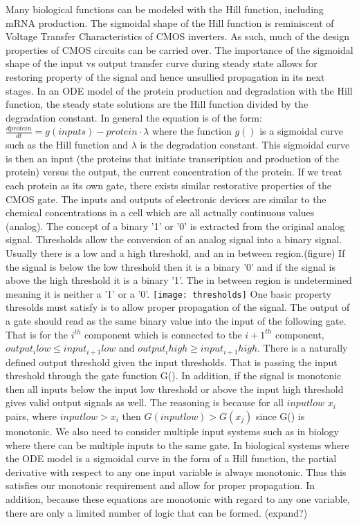 \documentclass{article}
\begin{document}
Many biological functions can be modeled with the Hill function, including mRNA production.  The sigmoidal shape of the Hill function is reminiscent of Voltage Transfer Characteristics of CMOS inverters.  As such, much of the design properties of CMOS circuits can be carried over.  The importance of the sigmoidal shape of the input vs output transfer curve during steady state allows for restoring property of the signal and hence unsullied propagation in its next stages.   In an ODE model of the protein production and degradation with the Hill function, the steady state solutions are the Hill function divided by the degradation constant.  In general the equation is of the form: $\frac{dprotein}{dt}=g(inputs)-protein\cdot\lambda$  where the function $g()$ is a sigmoidal curve such as the Hill function and $\lambda$ is the degradation constant.  This sigmoidal curve is then an input (the proteins that initiate transcription and production of the protein) versus the output, the current concentration of the protein.  If we treat each protein as its own gate, there exists similar restorative properties of the CMOS gate.
\newline \newline
The inputs and outputs of electronic devices are similar to the chemical concentrations in a cell which are all actually continuous values (analog).  The concept of a binary '1' or '0' is extracted from the original analog signal.  Thresholds allow the conversion of an analog signal into a binary signal.  Usually there is a low and a high threshold, and an in between region.(figure)  If the signal is below the low threshold then it is a binary '0' and if the signal is above the high threshold it is a binary '1'.  The in between region is undetermined meaning it is neither a '1' or a '0'.   
\newline
\texttt{[image: thresholds]}
\newline
One basic property thresolds must satisfy is to allow proper propagation of the signal.  The output of a gate should read as the same binary value into the input of the following gate.  That is for the $i^{th}$ component which is connected to the $i+1^{th}$ component, $output_i low \leq input_{i+1} low$ and $output_i high \geq input_{i+1} high$.  There is a naturally defined output threshold given the input thresholds.  That is passing the input threshold through the gate function G(). In addition, if the signal is monotonic then all inputs below the input low threshold or above the input high threshold gives valid output signals as well.  The reasoning is because for all $input low$ $x_i$ pairs, where $input low>x_i$ then $G(input low)>G(x_j)$ since G() is monotonic.  We also need to consider multiple input systems such as in biology where there can be multiple inputs to the same gate.  In biological systems where the ODE model is a sigmoidal curve in the form of a Hill function, the partial derivative with respect to any one input variable is always monotonic.  Thus this satisfies our monotonic requirement and allow for proper propagation.  In addition, because these equations are monotonic with regard to any one variable, there are only a limited number of logic that can be formed.  (expand?)
\end{document}
